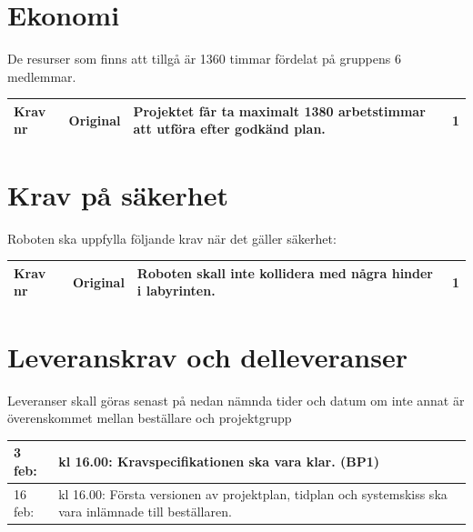 \documentclass[11pt]{article}
\newcounter{kravc}
\newcommand{\kravcc}{
	\thekravc
	\stepcounter{kravc}
}
\begin{document}
\begin{flushleft}
\begin{center}
\begin{longtable}{|l|l|p{.70\linewidth}|l|}
\end{longtable}
\end{center}

\section{Ekonomi}
De resurser som finns att tillgå är 1360 timmar fördelat på gruppens 6 medlemmar. 

\begin{center}
\begin{longtable}{|l|l|p{.70\linewidth}|l|} \hline

Krav nr\kravcc &
Original &
Projektet får ta maximalt 1380 arbetstimmar att utföra efter godkänd plan. &
1 \\ \hline
\end{longtable}
\end{center}

\section{Krav på säkerhet}
Roboten ska uppfylla följande krav när det gäller säkerhet:

\begin{center}
\begin{longtable}{|l|l|p{.70\linewidth}|l|} \hline

Krav nr\kravcc &
Original &
Roboten skall inte kollidera med några hinder i labyrinten. &
1 \\ \hline

\end{longtable}
\end{center}

\pagebreak
\section{Leveranskrav och delleveranser}
Leveranser skall göras senast på nedan nämnda tider och datum om inte annat är överenskommet mellan beställare och projektgrupp
\begin{center}
\begin{longtable}{|l |p{.8\linewidth}|} \hline

3 feb: & 
kl 16.00: Kravspecifikationen ska vara klar. (BP1) \\ \hline

16 feb: & 
kl 16.00: Första versionen av projektplan, tidplan och systemskiss ska vara inlämnade till beställaren. \\ \hline


\end{longtable}
\end{center}
\end{flushleft}
\end{document}

